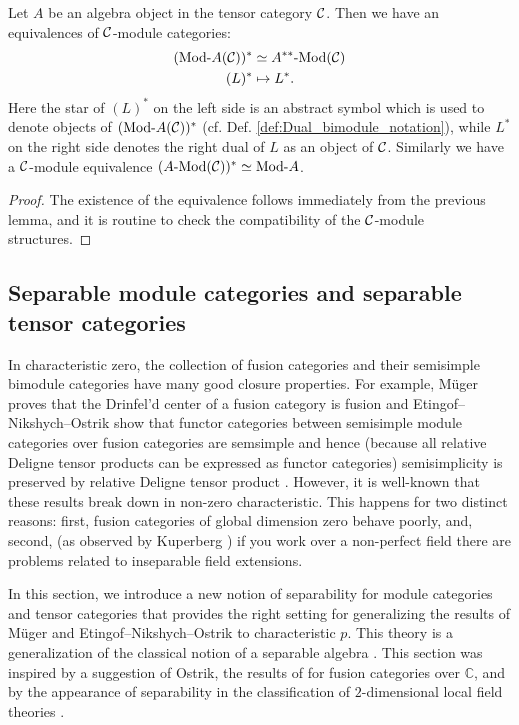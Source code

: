 \documentclass{amsart}
\begin{document}
\begin{lemma}
	Let $A$ be an algebra object in the tensor category $\mathcal C$. Then we have an equivalences of $\mathcal C$-module categories: 
	\begin{align*}
		(\Mod{}{A}(\cC))^* & \simeq \Mod{A^{**}}{}(\cC) \\
		(L)^* & \mapsto L^*.
	\end{align*}
	Here the star of $(L)^*$ on the left side is an abstract symbol which is used to denote objects of $(\Mod{}{A}(\cC))^*$ (cf. Def. \ref{def:Dual_bimodule_notation}), while $L^*$ on the right side denotes the right dual of $L$ as an object of $\mathcal C$. Similarly we have a $\mathcal C$-module equivalence $(\Mod{A}{}(\cC))^* \simeq \Mod{}{A}$.	
\end{lemma}

\begin{proof}
	The existence of the equivalence follows immediately from the previous lemma, and it is routine to check the compatibility of the $\mathcal C$-module structures.  
\end{proof}

\subsection{Separable module categories and separable tensor categories} \label{sec:tc-separable}
In characteristic zero, the collection of fusion categories and their semisimple bimodule categories have many good closure properties.  For example, M\"uger proves that the Drinfel'd center  of a fusion category is fusion \cite[Theorem 3.16]{MR1966525} and Etingof--Nikshych--Ostrik show that functor categories between semisimple module categories over fusion categories are semsimple and hence (because all relative Deligne tensor products can be expressed as functor categories) semisimplicity is preserved by relative Deligne tensor product \cite[Theorem 2.16]{MR2183279}.  However, it is well-known that these results break down in non-zero characteristic.  This happens for two distinct reasons: first, fusion categories of global dimension zero behave poorly, and, second, (as observed by Kuperberg \cite[Question 5.1]{MR1995781}) if you work over a non-perfect field there are problems related to inseparable field extensions.

In this section, we introduce a new notion of separability for module categories and tensor categories that provides the right setting for generalizing the results of M\"uger and Etingof--Nikshych--Ostrik to characteristic $p$.  This theory is a generalization of the classical notion of a separable algebra \cite{???}.   This section was inspired by a suggestion of Ostrik, the results of \cite[\S 2.4]{MR3039775} for fusion categories over $\mathbb{C}$, and by the appearance of separability in the classification of $2$-dimensional local field theories \cite{schommer-pries-thesis}.
\end{document}
